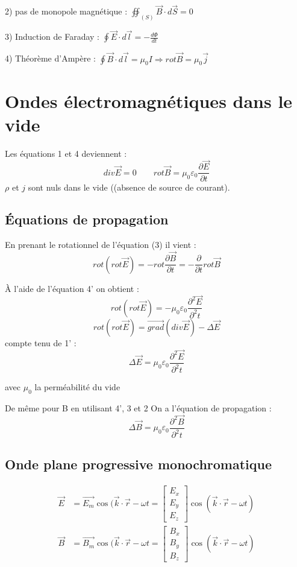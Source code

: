 \documentclass[12pt,a4paper]{report}
\begin{document}
2) pas de monopole magnétique : \( \oiint_{(S)} \vec{B} \cdot d\vec{S} = 0\)

3) Induction de Faraday : \(\oint \vec{E} \cdot d\vec{l} = - \frac{d \Phi}{dt}\)

4) Théorème d'Ampère : \(\oint \vec{B} \cdot d\vec{l} = \mu_0I \Rightarrow rot \vec{B} = \mu_0 \vec{j}\)

\section{Ondes électromagnétiques dans le vide}

Les équations 1 et 4 deviennent :
\[
	div \vec{E} = 0 \quad \quad rot \vec{B} = \mu_0 \varepsilon_0 \dfrac{\partial \vec{E}}{\partial t}
\]
\(\rho\) et \(j\) sont nuls dans le vide ((absence de source de courant).

\subsection{Équations de propagation}

En prenant le rotationnel de l'équation (3) il vient :
\[
	rot (rot \vec{E}) = - rot \dfrac{\partial \vec{B}}{\partial t} = - \dfrac{\partial}{\partial t} rot \vec{B}
\]

À l'aide de l'équation 4' on obtient :
\[
	rot (rot \vec{E}) = - \mu_0 \varepsilon_0 \dfrac{\partial^2 \vec{E}}{\partial^2 t}
\]
\[
	rot (rot \vec{E}) = \vec{grad} (div \vec{E}) - \Delta \vec{E}
\]
compte tenu de 1' :
\[
	\Delta \vec{E} = \mu_0 \varepsilon_0 \dfrac{\partial^2 \vec{E}}{\partial^2 t}
\]

avec \(\mu_0\) la perméabilité du vide

De même pour B en utilisant 4', 3 et 2
On a l'équation de propagation :
\[
	\Delta \vec{B} = \mu_0 \varepsilon_0 \dfrac{\partial^2 \vec{B}}{\partial^2 t}
\]

\subsection{Onde plane progressive monochromatique}

\begin{align}
    \vec{E} &= \vec{E_m} \cos(\vec{k} \cdot \vec{r} - \omega t = \begin{bmatrix}
           E_x \\
           E_y \\
           E_z
         \end{bmatrix} \cos (\vec{k} \cdot \vec{r} - \omega t)\\         
    \vec{B} &= \vec{B_m} \cos(\vec{k} \cdot \vec{r} - \omega t = \begin{bmatrix}
           B_x \\
           B_y \\
           B_z
         \end{bmatrix} \cos (\vec{k} \cdot \vec{r} - \omega t)
  \end{align}
\end{document}
